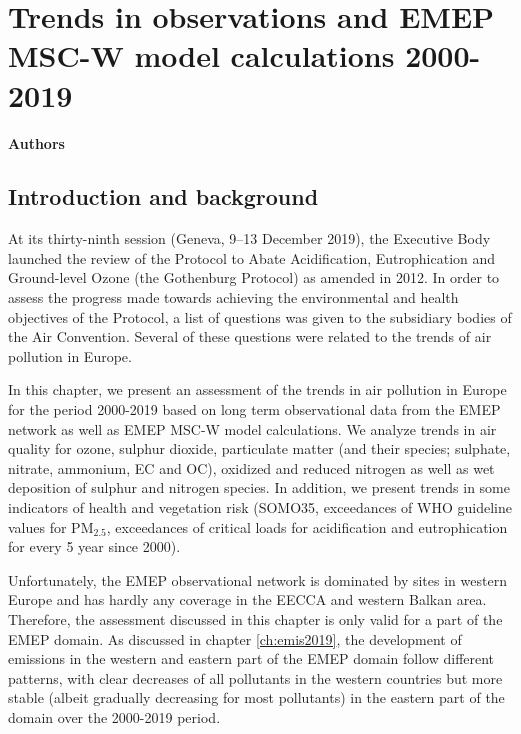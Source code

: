 \chapter[Trends]{Trends in observations and EMEP MSC-W model calculations 2000-2019}
\label{ch:Trends}

{\bf{Authors}}\\


\section{\label{sec:Trends_introduction}Introduction and background}
At its thirty-ninth session (Geneva, 9–13 December 2019), the Executive Body launched the review of the Protocol to Abate Acidification, Eutrophication and Ground-level Ozone (the Gothenburg Protocol) as amended in 2012. In order to assess  the progress made towards achieving the environmental and health objectives of the Protocol, a
list of questions was given to the subsidiary bodies of the Air Convention. Several of these questions were related to the trends of air pollution in Europe. 

In this chapter, we present an assessment of the trends in air pollution in Europe for the period 2000-2019 based on long term observational data from the EMEP network as well as EMEP MSC-W model calculations. We analyze trends in air quality for ozone, sulphur dioxide, particulate matter (and their species; sulphate, nitrate, ammonium, EC and OC), oxidized and reduced nitrogen as well as wet deposition of sulphur and nitrogen species. In addition, we present trends in some indicators of health and vegetation risk (SOMO35, exceedances of WHO guideline values for PM$_{2.5}$, exceedances of critical loads for acidification and eutrophication for every 5 year since 2000).

Unfortunately, the EMEP observational network is dominated by sites in western Europe and has hardly any coverage in the EECCA and western Balkan area. Therefore, the assessment discussed in this chapter is only valid for a part of the EMEP domain. As discussed in chapter \ref{ch:emis2019}, the development of emissions in the western and eastern part of the EMEP domain follow different patterns, with clear decreases of all pollutants in the western countries  but more stable (albeit gradually decreasing for most pollutants) in the eastern part of the domain over the 2000-2019 period. 




